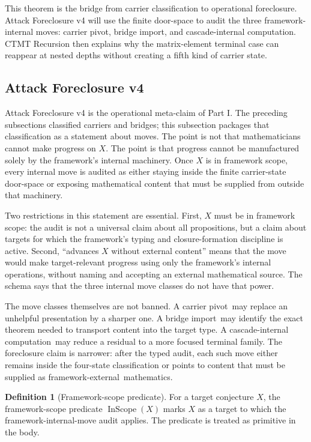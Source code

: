 \documentclass[11pt]{article}
\newcommand{\carrierPivot}{carrier pivot}
\newcommand{\bridgeImport}{bridge import}
\newcommand{\cascadeInternal}{cascade-internal computation}
\newcommand{\FwExternal}{framework-external}
\theoremstyle{definition}
\newtheorem{definition}[theorem]{Definition}
\begin{document}
This theorem is the bridge from carrier classification to operational
foreclosure.  Attack Foreclosure v4 will use the finite door-space to
audit the three framework-internal moves: carrier pivot, bridge import,
and cascade-internal computation.  CTMT Recursion then explains why the
matrix-element terminal case can reappear at nested depths without
creating a fifth kind of carrier state.

\subsection{Attack Foreclosure v4}\label{sec:foreclosure:attack-foreclosure-v4}

Attack Foreclosure v4 is the operational meta-claim of Part I.  The
preceding subsections classified carriers and bridges; this subsection
packages that classification as a statement about moves.  The point is
not that mathematicians cannot make progress on \(X\).  The point is
that progress cannot be manufactured solely by the framework's internal
machinery.  Once \(X\) is in framework scope, every internal move is
audited as either staying inside the finite carrier-state door-space or
exposing mathematical content that must be supplied from outside that
machinery.

Two restrictions in this statement are essential.  First, \(X\) must be
in framework scope: the audit is not a universal claim about all
propositions, but a claim about targets for which the framework's
typing and closure-formation discipline is active.  Second, ``advances
\(X\) without external content'' means that the move would make
target-relevant progress using only the framework's internal
operations, without naming and accepting an external mathematical
source.  The schema says that the three internal move classes do not
have that power.

The move classes themselves are not banned.  A \carrierPivot\ may
replace an unhelpful presentation by a sharper one.  A \bridgeImport\
may identify the exact theorem needed to transport content into the
target type.  A \cascadeInternal\ may reduce a residual to a more
focused terminal family.  The foreclosure claim is narrower: after the
typed audit, each such move either remains inside the four-state
classification or points to content that must be supplied as
\FwExternal\ mathematics.

\begin{definition}[Framework-scope predicate]\label{def:in-scope}
For a target conjecture \(X\), the framework-scope predicate
\(\operatorname{InScope}(X)\) marks \(X\) as a target to which the
framework-internal-move audit applies.  The predicate is treated as
primitive in the body.
\end{definition}
\end{document}
